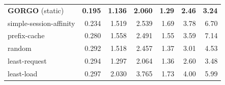\begin{table}[t]
\begin{tabular}{lrrr|rrr}
\textbf{GORGO} (static)    & \textbf{0.195} & \textbf{1.136} & \textbf{2.060} & \textbf{1.29} & \textbf{2.46} & \textbf{3.24} \\
simple-session-affinity    & 0.234 & 1.519 & 2.539 & 1.69 & 3.78 & 6.70 \\
prefix-cache               & 0.280 & 1.558 & 2.491 & 1.55 & 3.59 & 7.14 \\
random                     & 0.292 & 1.518 & 2.457 & 1.37 & 3.01 & 4.53 \\
least-request              & 0.294 & 1.297 & 2.064 & 1.36 & 2.60 & 3.48 \\
least-load                 & 0.297 & 2.030 & 3.765 & 1.73 & 4.00 & 5.99 \\
\bottomrule
\end{tabular}
\end{table}


